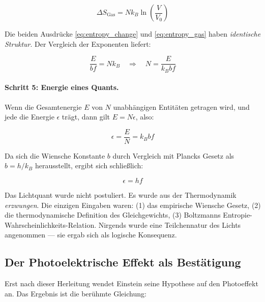 \begin{equation}
    \Delta S_{\text{Gas}} = N k_B \ln\!\left(\frac{V}{V_0}\right)
    \label{eq:entropy_gas}
\end{equation}

Die beiden Ausdrücke \eqref{eq:entropy_change} und \eqref{eq:entropy_gas} haben 
\emph{identische Struktur}. Der Vergleich der Exponenten liefert:

\begin{equation}
    \frac{E}{bf} = N k_B \quad \Longrightarrow \quad N = \frac{E}{k_B b f}
    \label{eq:quanta_count}
\end{equation}

\paragraph{Schritt 5: Energie eines Quants.}
Wenn die Gesamtenergie $E$ von $N$ unabhängigen Entitäten getragen wird, und jede 
die Energie $\epsilon$ trägt, dann gilt $E = N\epsilon$, also:

\begin{equation}
    \epsilon = \frac{E}{N} = k_B b f
    \label{eq:quantum_energy_wien}
\end{equation}

Da sich die Wiensche Konstante $b$ durch Vergleich mit Plancks Gesetz als 
$b = h/k_B$ herausstellt, ergibt sich schließlich:

\begin{equation}
    \boxed{\epsilon = hf}
    \label{eq:quantum_energy_final}
\end{equation}

\begin{revolutionary}
    Das Lichtquant wurde nicht postuliert. Es wurde aus der Thermodynamik 
    \emph{erzwungen}. Die einzigen Eingaben waren: (1) das empirische Wiensche Gesetz, 
    (2) die thermodynamische Definition des Gleichgewichts, (3) Boltzmanns 
    Entropie-Wahrscheinlichkeits-Relation. Nirgends wurde eine Teilchennatur des 
    Lichts angenommen — sie ergab sich als logische Konsequenz.
\end{revolutionary}

\subsection{Der Photoelektrische Effekt als Bestätigung}

Erst nach dieser Herleitung wendet Einstein seine Hypothese auf den Photoeffekt an. 
Das Ergebnis ist die berühmte Gleichung:

